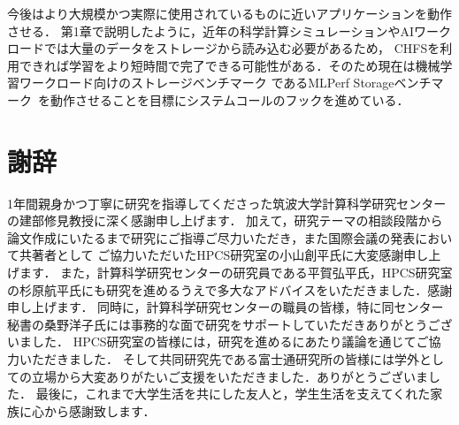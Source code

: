 \documentclass[a4paper,11pt]{jreport}
\begin{document}
今後はより大規模かつ実際に使用されているものに近いアプリケーションを動作させる．
第1章で説明したように，近年の科学計算シミュレーションやAIワークロードでは大量のデータをストレージから読み込む必要があるため，
CHFSを利用できれば学習をより短時間で完了できる可能性がある．そのため現在は機械学習ワークロード向けのストレージベンチマーク
であるMLPerf Storageベンチマーク~\cite{mlperfstorage}を動作させることを目標にシステムコールのフックを進めている．

\chapter*{謝辞}
1年間親身かつ丁寧に研究を指導してくださった筑波大学計算科学研究センターの建部修見教授に深く感謝申し上げます．
加えて，研究テーマの相談段階から論文作成にいたるまで研究にご指導ご尽力いただき，また国際会議の発表において共著者として
ご協力いただいたHPCS研究室の小山創平氏に大変感謝申し上げます．
また，計算科学研究センターの研究員である平賀弘平氏，HPCS研究室の杉原航平氏にも研究を進めるうえで多大なアドバイスをいただきました．感謝申し上げます．
同時に，計算科学研究センターの職員の皆様，特に同センター秘書の桑野洋子氏には事務的な面で研究をサポートしていただきありがとうございました．
HPCS研究室の皆様には，研究を進めるにあたり議論を通じてご協力いただきました．
そして共同研究先である富士通研究所の皆様には学外としての立場から大変ありがたいご支援をいただきました．ありがとうございました．
最後に，これまで大学生活を共にした友人と，学生生活を支えてくれた家族に心から感謝致します．

\newpage

\renewcommand{\bibname}{参考文献}



\end{document}
